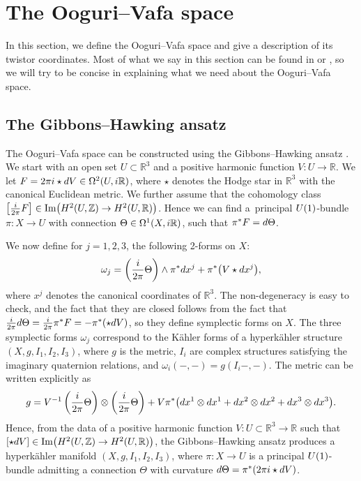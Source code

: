 \documentclass[11pt]{article}
\numberwithin{equation}{section}
\numberwithin{equation}{section}
\begin{document}
\section{The Ooguri--Vafa space}\label{OVsec}
In this section, we define the Ooguri--Vafa space \cite{OV} and give a description of its twistor coordinates. Most of what we say in this section can be found in \cite{GMN1} or \cite{GW}, so we will try to be concise in explaining what we need about the Ooguri--Vafa space.

\subsection{The Gibbons--Hawking ansatz}

The Ooguri--Vafa space can be constructed using the Gibbons--Hawking ansatz \cite{GHansatz}. We start with an open set $U\subset \mathbb{R}^{3}$ and a positive harmonic function $V\colon U\to \mathbb{R}$. We let $F= 2\pi {\rm i}\star {\rm d}V \in \Omega^{2}(U,{\rm i}\mathbb{R})$, where $\star$ denotes the Hodge star in $\mathbb{R}^3$ with the canonical Euclidean metric. We further assume that the cohomology class $\bigl[\frac{{\rm i}}{2\pi}F\bigr]\in \operatorname{Im}\bigl(H^2(U,\mathbb{Z})\to H^2(U,\mathbb{R})\bigr)$. Hence we can find a~principal ${\rm U}(1)$-bundle $\pi\colon X\to U$ with connection $\Theta\in \Omega^1(X,{\rm i}\mathbb{R})$, such that $\pi^{*}F={\rm d}\Theta$.

We now define for $j=1,2,3$, the following 2-forms on $X$:
\begin{equation}\label{sympGH}
 \omega_j=\left(\frac{{\rm i}}{2\pi}\Theta\right)\wedge \pi^*{\rm d}x^j +\pi^*\bigl(V \star {\rm d}x^{j}\bigr),
\end{equation}
where $x^j$ denotes the canonical coordinates of $\mathbb{R}^3$. The non-degeneracy is easy to check, and the fact that they are closed follows from the fact that $\frac{{\rm i}}{2\pi}{\rm d}\Theta=\frac{{\rm i}}{2\pi}\pi^*F=-\pi^*(\star {\rm d}V)$, so they define symplectic forms on $X$. The three symplectic forms $\omega_j$ correspond to the K\"ahler forms of a hyperk\"ahler structure $(X,g,I_1,I_2,I_3)$, where $g$ is the metric, $I_i$ are complex structures satisfying the imaginary quaternion relations, and $\omega_i(-,-)=g(I_i-,-)$. The metric can be written explicitly as
\begin{equation}\label{HKmetric}
 g=V^{-1}\left(\frac{{\rm i}}{2\pi}\Theta\right)\otimes \left(\frac{{\rm i}}{2\pi}\Theta\right)+V\pi^*\bigl({\rm d}x^1\otimes {\rm d}x^1+{\rm d}x^2\otimes {\rm d}x^2+{\rm d}x^3\otimes {\rm d}x^3\bigr).
\end{equation}
Hence, from the data of a positive harmonic function $V\colon U\subset \mathbb{R}^{3}\to \mathbb{R}$ such that $[\star {\rm d}V]\in \operatorname{Im}\bigl(H^2(U,\mathbb{Z})\to H^2(U,\mathbb{R})\bigr)$, the Gibbons--Hawking ansatz produces a hyperk\"ahler manifold $(X,g,I_1,I_2,I_3)$, where $\pi\colon X\to U$ is a principal ${\rm U}(1)$-bundle admitting a connection $\Theta$ with curvature ${\rm d}\Theta=\pi^*(2\pi {\rm i}\star {\rm d}V)$.
\end{document}
